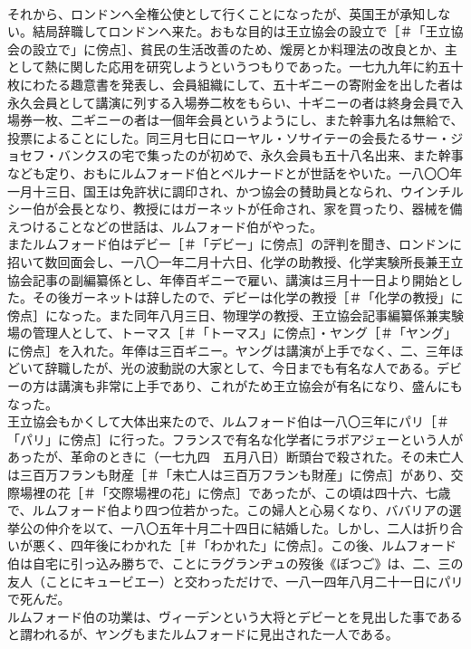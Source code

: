 \documentclass[8pt]{extreport}
\begin{document}
\begin{CJK}{UTF8}{min}
\\	それから、ロンドンへ全権公使として行くことになったが、英国王が承知しない。結局辞職してロンドンへ来た。おもな目的は王立協会の設立で［＃「王立協会の設立で」に傍点］、貧民の生活改善のため、煖房とか料理法の改良とか、主として熱に関した応用を研究しようというつもりであった。一七九九年に約五十枚にわたる趣意書を発表し、会員組織にして、五十ギニーの寄附金を出した者は永久会員として講演に列する入場券二枚をもらい、十ギニーの者は終身会員で入場券一枚、二ギニーの者は一個年会員というようにし、また幹事九名は無給で、投票によることにした。同三月七日にローヤル・ソサイテーの会長たるサー・ジョセフ・バンクスの宅で集ったのが初めで、永久会員も五十八名出来、また幹事なども定り、おもにルムフォード伯とベルナードとが世話をやいた。一八〇〇年一月十三日、国王は免許状に調印され、かつ協会の賛助員となられ、ウインチルシー伯が会長となり、教授にはガーネットが任命され、家を買ったり、器械を備えつけることなどの世話は、ルムフォード伯がやった。
\\	またルムフォード伯はデビー［＃「デビー」に傍点］の評判を聞き、ロンドンに招いて数回面会し、一八〇一年二月十六日、化学の助教授、化学実験所長兼王立協会記事の副編纂係とし、年俸百ギニーで雇い、講演は三月十一日より開始とした。その後ガーネットは辞したので、デビーは化学の教授［＃「化学の教授」に傍点］になった。また同年八月三日、物理学の教授、王立協会記事編纂係兼実験場の管理人として、トーマス［＃「トーマス」に傍点］・ヤング［＃「ヤング」に傍点］を入れた。年俸は三百ギニー。ヤングは講演が上手でなく、二、三年ほどいて辞職したが、光の波動説の大家として、今日までも有名な人である。デビーの方は講演も非常に上手であり、これがため王立協会が有名になり、盛んにもなった。
\\	王立協会もかくして大体出来たので、ルムフォード伯は一八〇三年にパリ［＃「パリ」に傍点］に行った。フランスで有名な化学者にラボアジェーという人があったが、革命のときに（一七九四　五月八日）断頭台で殺された。その未亡人は三百万フランも財産［＃「未亡人は三百万フランも財産」に傍点］があり、交際場裡の花［＃「交際場裡の花」に傍点］であったが、この頃は四十六、七歳で、ルムフォード伯より四つ位若かった。この婦人と心易くなり、ババリアの選挙公の仲介を以て、一八〇五年十月二十四日に結婚した。しかし、二人は折り合いが悪く、四年後にわかれた［＃「わかれた」に傍点］。この後、ルムフォード伯は自宅に引っ込み勝ちで、ことにラグランヂュの歿後《ぼつご》は、二、三の友人（ことにキュービエー）と交わっただけで、一八一四年八月二十一日にパリで死んだ。
\\	ルムフォード伯の功業は、ヴィーデンという大将とデビーとを見出した事であると謂われるが、ヤングもまたルムフォードに見出された一人である。

\end{CJK}
\end{document}
